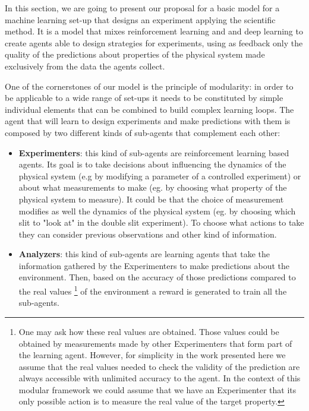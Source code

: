 \documentclass[11pt,a4paper,twoside]{report}
\newcommand{\+}{\textnormal{+} }
\theoremstyle{definition}
\numberwithin{equation}{chapter}
\begin{document}
In this section, we are going to present our proposal for a basic model for a
machine learning set-up that designs an experiment applying the scientific
method. It is a model that mixes reinforcement learning and and deep learning to
create agents able to design strategies for experiments, using as feedback only
the quality of the predictions about properties of the physical system made
exclusively from the data the agents collect. 

One of the cornerstones of our model is the principle of modularity: in order to
be applicable to a wide range of set-ups it needs to be constituted by simple
individual elements that can be combined to build complex learning loops. The
agent that will learn to design experiments and make predictions with them is
composed by two different kinds of sub-agents that complement each other:

\begin{itemize}
  \item \textbf{Experimenters}: this kind of sub-agents are reinforcement
  learning based agents. Its goal is to take decisions about influencing the
  dynamics of the physical system (e.g by modifying a parameter of a controlled
  experiment) or about what measurements to make (eg. by choosing what property
  of the physical system to measure). It could be that the choice of
  measurement modifies as well the dynamics of the physical system (eg. by
  choosing which slit to "look at" in the double slit experiment). To choose
  what actions to take they can consider previous observations and other kind of 
  information.
  \item \textbf{Analyzers}: this kind of sub-agents are learning agents
  that take the information gathered by the Experimenters to make predictions
  about the environment. Then, based on the accuracy of those predictions
  compared to the real values \footnote{One may ask how these real values are
  obtained. Those values could be obtained by measurements made by other
  Experimenters that form part of the learning agent. However, for simplicity in
  the work presented here we assume that the real values needed to check the
  validity of the prediction are always accessible with unlimited accuracy to
  the agent. In the context of this modular framework we could assume that we
  have an Experimenter that its only possible action is to measure the real
  value of the target property.} of the environment a reward is generated to
  train all the sub-agents. 

\end{itemize}
\end{document}
